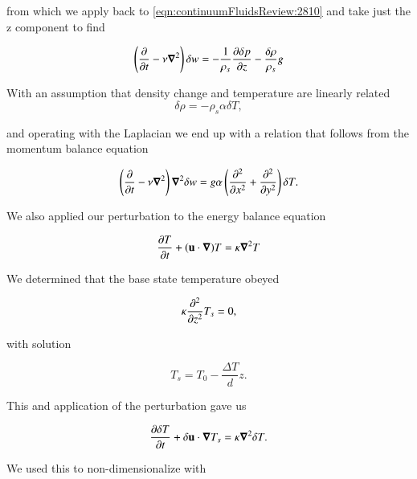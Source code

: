 from which we apply back to \ref{eqn:continuumFluidsReview:2810} and take just the z component to find

\begin{equation}\label{eqn:continuumFluidsReview:2850}
\left( \PD{t}{} - \nu \spacegrad^2 \right) \delta w = -\inv{\rho_s} \PD{z}{\delta p} - \frac{\delta \rho}{\rho_s} g
\end{equation}

With an assumption that density change and temperature are linearly related
\begin{equation}\label{eqn:continuumFluidsReview:2870}
\delta \rho = - \rho_s \alpha \delta T,
\end{equation}

and operating with the Laplacian we end up with a relation that follows from the momentum balance equation

\begin{equation}\label{eqn:continuumFluidsReview:2890}
\left( \PD{t}{} - \nu \spacegrad^2 \right) \spacegrad^2 \delta w
=
g \alpha \left(
\PDSq{x}{}
+\PDSq{y}{}
\right)
\delta T.
\end{equation}

We also applied our perturbation to the energy balance equation

\begin{equation}\label{eqn:continuumFluidsReview:2910}
\PD{t}{T} + (\Bu \cdot \spacegrad) T = \kappa \spacegrad^2 T
\end{equation}

We determined that the base state temperature obeyed

\begin{equation}\label{eqn:continuumFluidsReview:2930}
\kappa \PDSq{z}{} T_s = 0,
\end{equation}

with solution

\begin{equation}\label{eqn:continuumFluidsReview:2950}
T_s = T_0 - \frac{\Delta T}{d} z.
\end{equation}

This and application of the perturbation gave us

\begin{equation}\label{eqn:continuumFluidsReview:2970}
\PD{t}{\delta T} + \delta \Bu \cdot \spacegrad T_s = \kappa \spacegrad^2 \delta T.
\end{equation}

We used this to non-dimensionalize with

